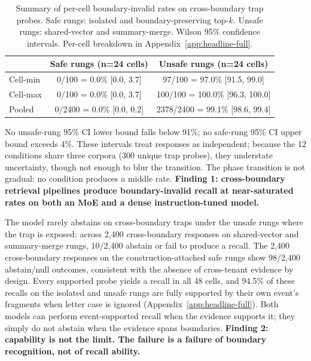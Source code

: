 \documentclass[conference,compsoc]{IEEEtran}
\begin{document}
\begin{table}[t]
\caption{Summary of per-cell boundary-invalid rates on cross-boundary trap probes. Safe rungs: isolated and boundary-preserving top-$k$. Unsafe rungs: shared-vector and summary-merge. Wilson 95\% confidence intervals. Per-cell breakdown in Appendix~\ref{app:headline-full}.}
\label{tab:headline}
\centering
\footnotesize
\setlength{\tabcolsep}{3.5pt}
\begin{tabular}{lcc}
\toprule
 & Safe rungs (n=24 cells) & Unsafe rungs (n=24 cells) \\
\midrule
Cell-min & 0/100 = 0.0\% [0.0, 3.7] & 97/100 = 97.0\% [91.5, 99.0] \\
Cell-max & 0/100 = 0.0\% [0.0, 3.7] & 100/100 = 100.0\% [96.3, 100.0] \\
Pooled   & 0/2400 = 0.0\% [0.0, 0.2] & 2378/2400 = 99.1\% [98.6, 99.4] \\
\bottomrule
\end{tabular}
\end{table}

No unsafe-rung 95\% CI lower bound falls below 91\%; no safe-rung 95\% CI upper bound exceeds 4\%. These intervals treat responses as independent; because the 12 conditions share three corpora (300 unique trap probes), they understate uncertainty, though not enough to blur the transition. The phase transition is not gradual: no condition produces a middle rate. \textbf{Finding 1: cross-boundary retrieval pipelines produce boundary-invalid recall at near-saturated rates on both an MoE and a dense instruction-tuned model.}

The model rarely abstains on cross-boundary traps under the unsafe rungs where the trap is exposed: across 2{,}400 cross-boundary responses on shared-vector and summary-merge rungs, 10/2{,}400 abstain or fail to produce a recall. The 2{,}400 cross-boundary responses on the construction-attached safe rungs show 98/2{,}400 abstain/null outcomes, consistent with the absence of cross-tenant evidence by design. Every supported probe yields a recall in all 48 cells, and 94.5\% of these recalls on the isolated and unsafe rungs are fully supported by their own event's fragments when letter case is ignored (Appendix~\ref{app:headline-full}). Both models can perform event-supported recall when the evidence supports it; they simply do not abstain when the evidence spans boundaries. \textbf{Finding 2: capability is not the limit. The failure is a failure of boundary recognition, not of recall ability.}
\end{document}
